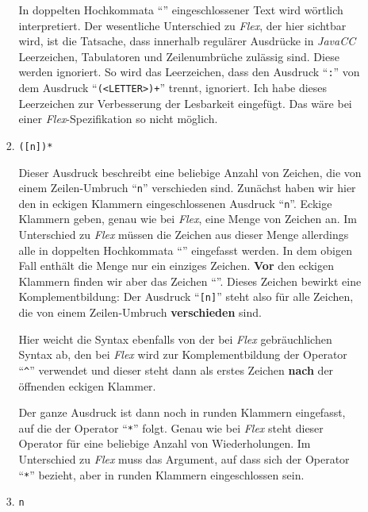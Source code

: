 \begin{enumerate}
\begin{enumerate}
\begin{enumerate}
                  In doppelten Hochkommata ``\texttt{}'' eingeschlossener Text
                  wird w\"ortlich interpretiert.  Der wesentliche Unterschied zu \textsl{Flex},
                  der hier sichtbar wird, ist die Tatsache, dass innerhalb regul\"arer Ausdr\"ucke in
                  \textsl{JavaCC}\/ Leerzeichen, Tabulatoren und Zeilenumbr\"uche zul\"assig sind.
                  Diese werden ignoriert.  So wird das Leerzeichen, dass den Ausdruck
                  ``\texttt{:}'' von dem Ausdruck
                  ``\texttt{(<LETTER>)+}'' trennt, ignoriert.  Ich habe dieses Leerzeichen
                  zur Verbesserung der Lesbarkeit eingef\"ugt.  Das w\"are bei einer
                  \textsl{Flex}-Spezifikation so nicht m\"oglich.
            \item \texttt{([n])*}

                  Dieser Ausdruck beschreibt eine beliebige Anzahl von Zeichen,
                  die von einem Zeilen-Umbruch ``\texttt{n}'' verschieden sind.
                  Zun\"achst haben wir hier den in eckigen Klammern eingeschlossenen
                  Ausdruck ``\texttt{n}''.  Eckige Klammern geben, genau wie bei
                  \textsl{Flex}, eine Menge von Zeichen an.  Im Unterschied zu \textsl{Flex}\/ 
                  m\"ussen die Zeichen aus dieser Menge allerdings alle in doppelten Hochkommata
                  ``\texttt{}'' eingefasst werden.  
                  In dem obigen Fall enth\"alt die Menge nur ein einziges
                  Zeichen.  \textbf{Vor} den eckigen Klammern finden wir aber das Zeichen
                  ``\texttt{}''.  Dieses Zeichen bewirkt eine Komplementbildung:
                  Der Ausdruck ``\texttt{[n]}''
                  steht also f\"ur alle Zeichen, die von einem Zeilen-Umbruch \textbf{verschieden} sind.

                  Hier weicht die Syntax ebenfalls von der bei \textsl{Flex}\/ gebr\"auchlichen
                  Syntax ab, den bei \textsl{Flex}\/ wird zur Komplementbildung der Operator
                  ``\texttt{\^}'' verwendet und dieser steht dann als erstes Zeichen \textbf{nach} der
                  \"offnenden eckigen Klammer.

                  Der ganze Ausdruck ist dann noch in runden Klammern eingefasst, auf die der
                  Operator ``\texttt{*}'' folgt.  Genau wie bei \textsl{Flex}\/ steht dieser
                  Operator f\"ur eine beliebige Anzahl von Wiederholungen.
                  Im Unterschied zu \textsl{Flex}\/ muss das Argument, auf dass sich der
                  Operator ``\texttt{*}'' bezieht, aber in runden Klammern eingeschlossen
                  sein.
            \item \texttt{n}
          

\end{enumerate}
\end{enumerate}
\end{enumerate}
